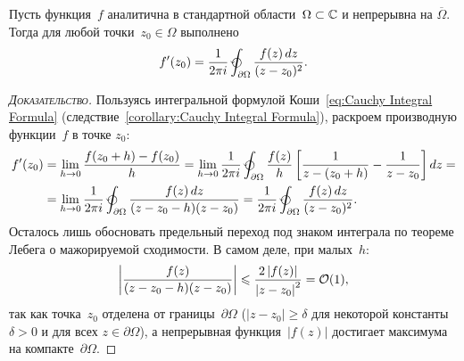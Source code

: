 \documentclass[../complex-analysis.tex]{subfiles}
\begin{document}
\begin{lm}
 \label{lemma:Derivative Cauchy Integral Formula}
 Пусть функция~$ f $ аналитична в стандартной области~$ \Omega \subset \mathbb{C} $ и непрерывна на $ \overline\Omega $. Тогда для любой точки~$ z_0 \in \Omega $ выполнено
 \begin{align}
  \label{eq:Derivative Cauchy Integral Formula}
  f'(z_0) = \frac{1}{2\pi i} \varointctrclockwise_{\partial\Omega} \frac{f(z)\,dz}{(z-z_0)^{2}}.
 \end{align}
\end{lm}
\begin{proof}[\normalfont\textsc{Доказательство}]
 Пользуясь интегральной формулой Коши~\eqref{eq:Cauchy Integral Formula} (следствие~\ref{corollary:Cauchy Integral Formula}), раскроем производную функции~$ f $ в точке $ z_0 $:
 \begin{align*}
  f'(z_0) &= \lim_{h\to 0} \frac{f(z_0 + h) - f(z_0)}{h} = \lim_{h \to 0}  \frac{1}{2\pi i}\varointctrclockwise_{\partial\Omega} \frac{f(z)}{h} \left[ \frac{1}{z-(z_0+h)} - \frac{1}{z-z_0} \right]dz = \\
  &= \lim_{h \to 0} \frac{1}{2\pi i} \varointctrclockwise_{\partial\Omega} \frac{f(z)\,dz}{(z - z_0 - h)(z - z_0)} = \frac{1}{2\pi i} \varointctrclockwise_{\partial\Omega} \frac{f(z)\,dz}{(z-z_0)^{2}}.
 \end{align*} Осталось лишь обосновать предельный переход под знаком интеграла по теореме Лебега о мажорируемой сходимости. В самом деле, при малых~$ h $:
 \begin{align*}
  \left| \frac{f(z)}{(z - z_0 - h)(z-z_0)} \right|  \leqslant \frac{2 \left| f(z) \right|}{\left| z-z_0 \right|^{2}} = \mathcal{O}(1),
 \end{align*} так как точка~$ z_0 $ отделена от границы~$ \partial\Omega $ ($ \left| z-z_0 \right| \geqslant \delta$ для некоторой константы $ \delta > 0$ и для всех $ z\in\partial\Omega $), а непрерывная функция~$ \left| f(z) \right| $ достигает максимума на компакте~$ \partial\Omega $.
\end{proof}
\end{document}
